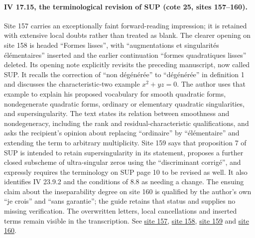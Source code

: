 \paragraph{IV 17.15, the terminological revision of SUP (cote 25, sites 157--160).}
Site 157 carries an exceptionally faint forward-reading impression; it is retained with extensive local doubts rather than treated as blank. The clearer opening on site 158 is headed ``Formes lisses'', with ``augmentations et singularités élémentaires'' inserted and the earlier continuation ``formes quadratiques lisses'' deleted. Its opening note explicitly revisits the preceding manuscript, now called SUP. It recalls the correction of ``non dégénérée'' to ``dégénérée'' in definition 1 and discusses the characteristic-two example $x^2+yz=0$. The author uses that example to explain his proposed vocabulary for smooth quadratic forms, nondegenerate quadratic forms, ordinary or elementary quadratic singularities, and supersingularity. The text states its relation between smoothness and nondegeneracy, including the rank and residual-characteristic qualifications, and asks the recipient's opinion about replacing ``ordinaire'' by ``élémentaire'' and extending the term to arbitrary multiplicity. Site 159 says that proposition 7 of SUP is intended to retain supersingularity in its statement, proposes a further closed subscheme of ultra-singular zeros using the ``discriminant corrigé'', and expressly requires the terminology on SUP page 10 to be revised as well. It also identifies IV 23.9.2 and the conditions of 8.8 as needing a change. The ensuing claim about the inseparability degree on site 160 is qualified by the author's own ``je crois'' and ``sans garantie''; the guide retains that status and supplies no missing verification. The overwritten letters, local cancellations and inserted terms remain visible in the transcription. See \href{https://grothendieck.umontpellier.fr/web/viewer.html?file=../25.pdf#page=158}{site 157}, \href{https://grothendieck.umontpellier.fr/web/viewer.html?file=../25.pdf#page=159}{site 158}, \href{https://grothendieck.umontpellier.fr/web/viewer.html?file=../25.pdf#page=160}{site 159} and \href{https://grothendieck.umontpellier.fr/web/viewer.html?file=../25.pdf#page=161}{site 160}.

